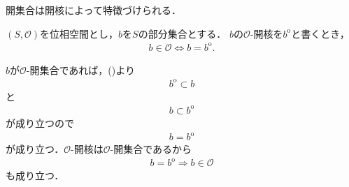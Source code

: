	開集合は開核によって特徴づけられる．
	\begin{screen}
		\begin{thm}[開集合は自身の開核に一致する集合である]
		\label{thm:open_set_coincides_with_its_interior}
			$(S,\mathscr{O})$を位相空間とし，$b$を$S$の部分集合とする．
			$b$の$\mathscr{O}$-開核を$b^{\mathrm{o}}$と書くとき，
			\begin{align}
				b \in \mathscr{O} \Longleftrightarrow b = b^{\mathrm{o}}.
			\end{align}
		\end{thm}
	\end{screen}
	
	\begin{sketch}
		$b$が$\mathscr{O}$-開集合であれば，()より
		\begin{align}
			b^{\mathrm{o}} \subset b
		\end{align}
		と
		\begin{align}
			b \subset b^{\mathrm{o}}
		\end{align}
		が成り立つので
		\begin{align}
			b = b^{\mathrm{o}}
		\end{align}
		が成り立つ．$\mathscr{O}$-開核は$\mathscr{O}$-開集合であるから
		\begin{align}
			b = b^{\mathrm{o}} \Longrightarrow b \in \mathscr{O}
		\end{align}
		も成り立つ．
		\QED
	\end{sketch}
	
